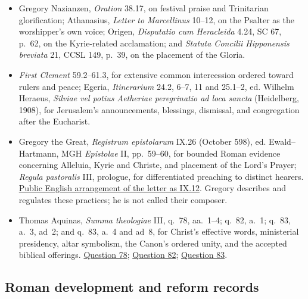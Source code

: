 \begin{itemize}
  \item Gregory Nazianzen, \emph{Oration} 38.17, on festival praise and Trinitarian glorification; Athanasius, \emph{Letter to Marcellinus} 10--12, on the Psalter as the worshipper's own voice; Origen, \emph{Disputatio cum Heracleida} 4.24, SC 67, p.~62, on the Kyrie-related acclamation; and \emph{Statuta Concilii Hipponensis breviata} 21, CCSL 149, p.~39, on the placement of the Gloria.
  \item \emph{First Clement} 59.2--61.3, for extensive common intercession ordered toward rulers and peace; Egeria, \emph{Itinerarium} 24.2, 6--7, 11 and 25.1--2, ed. Wilhelm Heraeus, \emph{Silviae vel potius Aetheriae peregrinatio ad loca sancta} (Heidelberg, 1908), for Jerusalem's announcements, blessings, dismissal, and congregation after the Eucharist.
  \item Gregory the Great, \emph{Registrum epistolarum} IX.26 (October 598), ed. Ewald--Hartmann, MGH \emph{Epistolae} II, pp.~59--60, for bounded Roman evidence concerning Alleluia, Kyrie and Christe, and placement of the Lord's Prayer; \emph{Regula pastoralis} III, prologue, for differentiated preaching to distinct hearers. \href{https://www.newadvent.org/fathers/360209012.htm}{Public English arrangement of the letter as IX.12}. Gregory describes and regulates these practices; he is not called their composer.
  \item Thomas Aquinas, \emph{Summa theologiae} III, q.~78, aa.~1--4; q.~82, a.~1; q.~83, a.~3, ad~2; and q.~83, a.~4 and ad~8, for Christ's effective words, ministerial presidency, altar symbolism, the Canon's ordered unity, and the accepted biblical offerings. \href{https://www.newadvent.org/summa/4078.htm}{Question 78}; \href{https://www.newadvent.org/summa/4082.htm}{Question 82}; \href{https://www.newadvent.org/summa/4083.htm}{Question 83}.
\end{itemize}

\subsection{Roman development and reform records}

